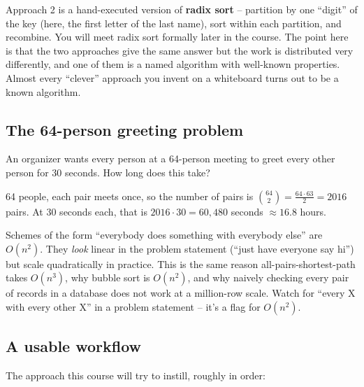 \documentclass[11pt]{article}
\begin{document}
\begin{ideabox}
Approach 2 is a hand-executed version of \textbf{radix sort} --
partition by one ``digit'' of the key (here, the first letter of the
last name), sort within each partition, and recombine. You will meet
radix sort formally later in the course. The point here is that the
two approaches give the same answer but the work is distributed very
differently, and one of them is a named algorithm with well-known
properties. Almost every ``clever'' approach you invent on a
whiteboard turns out to be a known algorithm.
\end{ideabox}

\subsection{The 64-person greeting problem}

An organizer wants every person at a 64-person meeting to greet every
other person for 30 seconds. How long does this take?

\begin{examplebox}
64 people, each pair meets once, so the number of pairs is
$\binom{64}{2} = \frac{64 \cdot 63}{2} = 2016$ pairs. At 30 seconds
each, that is $2016 \cdot 30 = 60{,}480$ seconds $\approx 16.8$ hours.
\end{examplebox}

\begin{ideabox}
Schemes of the form ``everybody does something with everybody else''
are $O(n^2)$. They \emph{look} linear in the problem statement
(``just have everyone say hi'') but scale quadratically in practice.
This is the same reason all-pairs-shortest-path takes $O(n^3)$, why
bubble sort is $O(n^2)$, and why naively checking every pair of
records in a database does not work at a million-row scale. Watch
for ``every X with every other X'' in a problem statement -- it's
a flag for $O(n^2)$.
\end{ideabox}

\subsection{A usable workflow}

The approach this course will try to instill, roughly in order:
\end{document}
